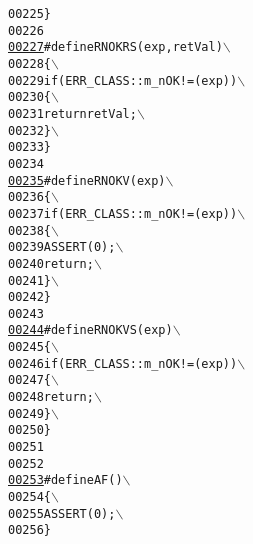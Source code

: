\begin{footnotesize}
\begin{alltt}
00225 \textcolor{preprocessor}{        \}}
00226 \textcolor{preprocessor}{}
\hypertarget{_macros_8h_source_l00227}{}\hyperlink{_macros_8h_ab60d02fd68cbb42379bc6676caefbc03}{00227} \textcolor{preprocessor}{#define RNOKRS( exp, retVal )       \(\backslash\)}
00228 \textcolor{preprocessor}{\{                                   \(\backslash\)}
00229 \textcolor{preprocessor}{        if( ERR\_CLASS::m\_nOK != ( exp ) ) \(\backslash\)}
00230 \textcolor{preprocessor}{\{                                 \(\backslash\)}
00231 \textcolor{preprocessor}{        return retVal;                  \(\backslash\)}
00232 \textcolor{preprocessor}{        \}                                 \(\backslash\)}
00233 \textcolor{preprocessor}{        \}}
00234 \textcolor{preprocessor}{}
\hypertarget{_macros_8h_source_l00235}{}\hyperlink{_macros_8h_abdfa39e2ed78de374bd760e5900bdcbd}{00235} \textcolor{preprocessor}{#define RNOKV( exp )                \(\backslash\)}
00236 \textcolor{preprocessor}{\{                                   \(\backslash\)}
00237 \textcolor{preprocessor}{        if( ERR\_CLASS::m\_nOK != ( exp ) ) \(\backslash\)}
00238 \textcolor{preprocessor}{\{                                 \(\backslash\)}
00239 \textcolor{preprocessor}{        ASSERT( 0 );                    \(\backslash\)}
00240 \textcolor{preprocessor}{        return;                         \(\backslash\)}
00241 \textcolor{preprocessor}{        \}                                 \(\backslash\)}
00242 \textcolor{preprocessor}{        \}}
00243 \textcolor{preprocessor}{}
\hypertarget{_macros_8h_source_l00244}{}\hyperlink{_macros_8h_a3eea1c5a1cac59092c6d5685cd2ea041}{00244} \textcolor{preprocessor}{#define RNOKVS( exp )               \(\backslash\)}
00245 \textcolor{preprocessor}{\{                                   \(\backslash\)}
00246 \textcolor{preprocessor}{        if( ERR\_CLASS::m\_nOK != ( exp ) ) \(\backslash\)}
00247 \textcolor{preprocessor}{\{                                 \(\backslash\)}
00248 \textcolor{preprocessor}{        return;                         \(\backslash\)}
00249 \textcolor{preprocessor}{        \}                                 \(\backslash\)}
00250 \textcolor{preprocessor}{        \}}
00251 \textcolor{preprocessor}{}
00252 
\hypertarget{_macros_8h_source_l00253}{}\hyperlink{_macros_8h_adad64e5408a0643c6ad57b93c29a7571}{00253} \textcolor{preprocessor}{#define AF( )                 \(\backslash\)}
00254 \textcolor{preprocessor}{\{                             \(\backslash\)}
00255 \textcolor{preprocessor}{        ASSERT( 0 );              \(\backslash\)}
00256 \textcolor{preprocessor}{        \}}

\end{alltt}
\end{footnotesize}
